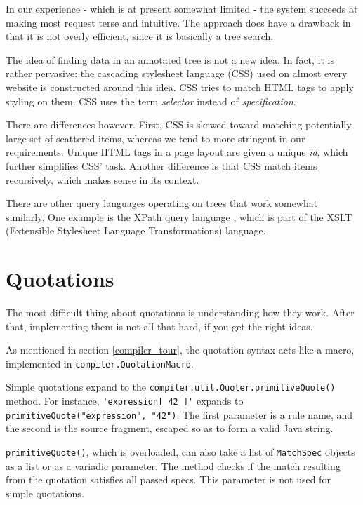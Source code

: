 In our experience - which is at present somewhat limited - the system succeeds
at making most request terse and intuitive. The approach does have a drawback in
that it is not overly efficient, since it is basically a tree search.

The idea of finding data in an annotated tree is not a new idea. In fact, it is
rather pervasive: the cascading stylesheet language (CSS) \cite{css_page} used
on almost every website is constructed around this idea. CSS tries to match HTML
tags to apply styling on them. CSS uses the term \emph{selector} instead of
\emph{specification}.

There are differences however. First, CSS is skewed toward matching potentially
large set of scattered items, whereas we tend to more stringent in our
requirements. Unique HTML tags in a page layout are given a unique \emph{id},
which further simplifies CSS' task. Another difference is that CSS match items
recursively, which makes sense in its context.

There are other query languages operating on trees that work somewhat
similarly. One example is the XPath query language \cite{xpath}, which is part
of the XSLT (Extensible Stylesheet Language Transformations) language.

\section{Quotations}
\label{implem_quotations}

The most difficult thing about quotations is understanding how they work. After
that, implementing them is not all that hard, if you get the right ideas.

As mentioned in section \ref{compiler_tour}, the quotation syntax acts like a
macro, implemented in \texttt{compiler.QuotationMacro}.

Simple quotations expand to the \texttt{compiler.util.Quoter.primitiveQuote()}
method. For instance, \lstinline{'expression[ 42 ]'} expands to
\texttt{primitiveQuote("expression", "42")}. The first parameter is a rule name,
and the second is the source fragment, escaped so as to form a valid Java
string.

\texttt{primitiveQuote()}, which is overloaded, can also take a list of
\texttt{MatchSpec} objects as a list or as a variadic parameter. The method
checks if the match resulting from the quotation satisfies all passed
specs. This parameter is not used for simple quotations.

